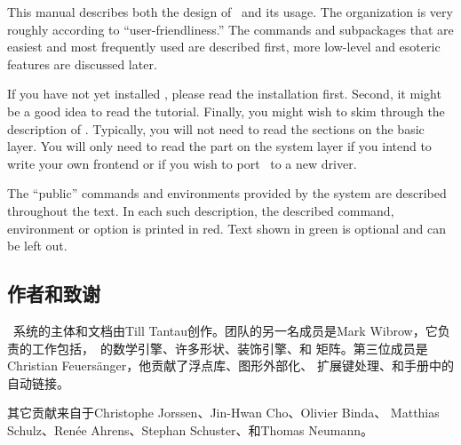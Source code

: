 This manual describes both the design of \tikzname\ and
its usage. The organization is very roughly according to
``user-friendliness.'' The commands and subpackages that are easiest
and most frequently used are described first, more low-level and
esoteric features are discussed later.

If you have not yet installed \tikzname, please read the installation
first. Second, it might be a good idea to read the tutorial. Finally,
you might wish to skim through the description of \tikzname. Typically,
you will not need to read the sections on the basic layer. You will
only need to read the part on the system layer if you intend to write
your own frontend or if you wish to port \pgfname\ to a new driver.

The ``public'' commands and environments provided by the system
are described throughout the text. In each such description, the
described command, environment or option is printed in red. Text shown
in green is optional and can be left out.


\subsection{作者和致谢}
\label{section-authors}


\pgfname\ 系统的主体和文档由Till Tantau创作。团队的另一名成员是Mark
Wibrow，它负责的工作包括，\pgfname\ 的数学引擎、许多形状、装饰引擎、和
矩阵。第三位成员是Christian Feuers\"anger，他贡献了浮点库、图形外部化、
扩展键处理、和手册中的自动链接。


其它贡献来自于Christophe Jorssen、Jin-Hwan Cho、Olivier Binda、
Matthias Schulz、Ren\'ee Ahrens、Stephan Schuster、和Thomas Neumann。


